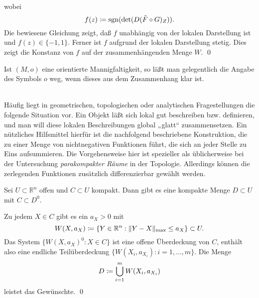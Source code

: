 \documentclass[a4paper,twoside,DIV15,BCOR12mm]{scrbook}
\DeclareMathOperator{\sgn}{sgn}
\begin{document}
wobei
\[ f(z) \da  \sgn ({\rm det}(D(\tilde{F} \circ G)_{Z})). \]
Die bewiesene Gleichung zeigt, daß $f$ unabhängig von der lokalen 
Darstellung ist und $f(z) \in \{-1,1\}$. Ferner ist $f$ aufgrund der 
lokalen Darstellung stetig. Dies zeigt die Konstanz von $f$ auf der 
zusammenhängenden Menge $W$. \qed\\









\bigskip

 Ist $(M,o)$ eine orientierte 
Mannigfaltigkeit, so läßt man gelegentlich die Angabe des Symbols $o$ weg, 
wenn dieses aus dem Zusammenhang klar ist.\\

\bigskip

 \\

\noindent
Häufig liegt in geometrischen, topologischen oder analytischen 
Fragestellungen die folgende Situation vor. Ein Objekt läßt sich 
lokal gut beschreiben bzw. definieren, und man will diese lokalen 
Beschreibungen global „glatt“ zusammensetzen. Ein nützliches 
Hilfsmittel hierfür ist die nachfolgend beschriebene Konstruktion, 
die zu einer Menge von nichtnegativen Funktionen führt, die sich an jeder Stelle zu 
Eins aufsummieren. Die Vorgehensweise hier ist spezieller als 
üblicherweise bei der Untersuchung {\em parakompakter Räume} in der 
Topologie. Allerdings können die zerlegenden Funktionen  
zusätzlich differenzierbar gewählt werden. 

\bigskip

\begin{lemma}\label{Lemma3.6.8} {Sei $U \subset {\mathbb R}^{n}$ offen 
und $C \subset U$ kompakt. Dann gibt es eine kompakte Menge $D \subset 
U$ mit $C \subset D^{0}$.}
\end{lemma}

\bigskip

 Zu jedem $X \in C$ gibt es ein $a_{X} > 0$ mit
\[ W(X, a_{X}) \da  \{Y \in {\mathbb R}^{n}: \|Y - X\|_{\max} \le 
a_{X}\} \subset U. \]
Das System $\{W(X,a_{X})^{0}: X \in C\}$ ist eine offene Überdeckung 
von $C$, enthält also eine endliche Teilüberdeckung 
$\{W(X_{i},a_{X_i}): i = 1,\dots,m\}$. Die Menge
\[ D \da  \bigcup_{i=1}^{m} W(X_{i},a_{X_i}) \]
leistet das Gewünschte. \qed\\
\end{document}
